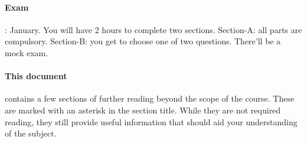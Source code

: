 \paragraph{Exam}: January. You will have 2 hours  to complete two sections. Section-A: all parts are compulsory. Section-B: you get to choose one of two questions. There'll be a mock exam.

\paragraph{This document} contains a few sections of further reading beyond the scope of the course. These are marked with an asterisk in the section title. While they are not required reading, they still provide useful information that should aid your understanding of the subject.
